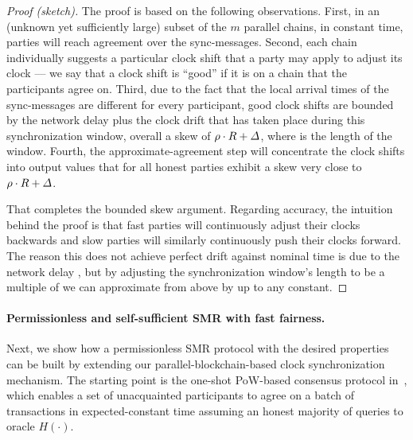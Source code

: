 \begin{proof}[Proof (sketch)]
    The proof is based on the following observations.
    First, in an (unknown yet sufficiently large) subset of the $m$ parallel chains, in constant time, parties will reach agreement over the sync-messages.
    Second, each chain individually suggests a particular clock shift that a party may apply to adjust its clock --- we say that a clock shift is ``good'' if it is on a chain that the participants agree on.
    Third, due to the fact that the local arrival times of the sync-messages are different for every participant, good clock shifts are bounded by the network delay \delay plus the clock drift that has taken place during
    this synchronization window, overall a skew of $\rho \cdot R + \varDelta$, where \syncLen is the length of the window.
    Fourth, the approximate-agreement step will concentrate the clock shifts into output values that for all honest parties exhibit a skew very close to $\rho \cdot R + \varDelta$.

    That completes the bounded skew argument.
    Regarding accuracy, the intuition behind the proof is that fast parties will continuously adjust their clocks backwards and slow parties will similarly continuously push their clocks forward.
    The reason this does not achieve perfect drift \clockDrift against nominal time is due to the network delay \delay, but by adjusting the synchronization window's length to be a multiple of \delay we can approximate \clockDrift from above by up to any constant.
\end{proof}

\paragraph{Permissionless and self-sufficient SMR with fast fairness.}
%
Next, we show how a permissionless SMR protocol with the desired properties can be built by extending our parallel-blockchain-based clock synchronization mechanism.
%
The starting point is the one-shot PoW-based consensus protocol in~\cite{EC:GarKiaShe24}, which enables a set of unacquainted participants to agree on a batch of transactions in expected-constant time assuming an honest majority
of queries to oracle $H(\cdot)$.

